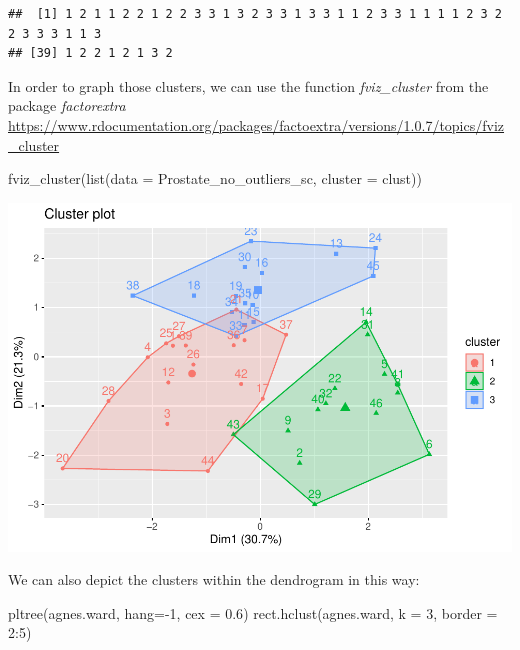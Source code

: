 \documentclass[
]{article}
\newenvironment{Shaded}{\begin{snugshade}}{\end{snugshade}}
\newcommand{\AttributeTok}[1]{\textcolor[rgb]{0.77,0.63,0.00}{#1}}
\newcommand{\DecValTok}[1]{\textcolor[rgb]{0.00,0.00,0.81}{#1}}
\newcommand{\FloatTok}[1]{\textcolor[rgb]{0.00,0.00,0.81}{#1}}
\newcommand{\FunctionTok}[1]{\textcolor[rgb]{0.00,0.00,0.00}{#1}}
\newcommand{\NormalTok}[1]{#1}
\newcommand{\SpecialCharTok}[1]{\textcolor[rgb]{0.00,0.00,0.00}{#1}}
\begin{document}
\begin{verbatim}
##  [1] 1 2 1 1 2 2 1 2 2 3 3 1 3 2 3 3 1 3 3 1 1 2 3 3 1 1 1 1 2 3 2 2 3 3 3 1 1 3
## [39] 1 2 2 1 2 1 3 2
\end{verbatim}

In order to graph those clusters, we can use the function
\emph{fviz\_cluster} from the package \emph{factorextra}
\url{https://www.rdocumentation.org/packages/factoextra/versions/1.0.7/topics/fviz_cluster}

\begin{Shaded}
\begin{Highlighting}[]
\FunctionTok{fviz\_cluster}\NormalTok{(}\FunctionTok{list}\NormalTok{(}\AttributeTok{data =}\NormalTok{ Prostate\_no\_outliers\_sc, }\AttributeTok{cluster =}\NormalTok{ clust))}
\end{Highlighting}
\end{Shaded}

\includegraphics{clustering_files/figure-latex/unnamed-chunk-35-1.pdf}

We can also depict the clusters within the dendrogram in this way:

\begin{Shaded}
\begin{Highlighting}[]
\FunctionTok{pltree}\NormalTok{(agnes.ward, }\AttributeTok{hang=}\SpecialCharTok{{-}}\DecValTok{1}\NormalTok{, }\AttributeTok{cex =} \FloatTok{0.6}\NormalTok{)}
\FunctionTok{rect.hclust}\NormalTok{(agnes.ward, }\AttributeTok{k =} \DecValTok{3}\NormalTok{, }\AttributeTok{border =} \DecValTok{2}\SpecialCharTok{:}\DecValTok{5}\NormalTok{)}
\end{Highlighting}
\end{Shaded}
\end{document}
